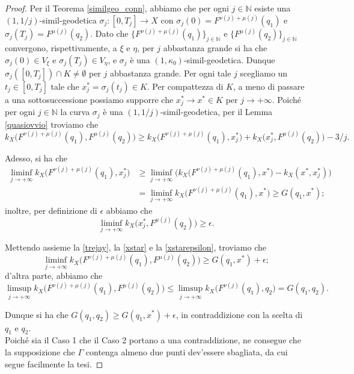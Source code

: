 \begin{proof}
    Per il Teorema \ref{similgeo_conn}, abbiamo che per ogni $j\in\mathbb{N}$ esiste una $(1,1/j)$-simil-geodetica $\sigma_j:[0,T_j]\longrightarrow X$ con $\sigma_j(0)=F^{\nu(j)+\mu(j)}(q_1)$ e $\sigma_j(T_j)=F^{\mu(j)}(q_2)$. Dato che $\{F^{\nu(j)+\mu(j)}(q_1)\}_{j\in\mathbb{N}}$ e $\{F^{\mu(j)}(q_2)\}_{j\in\mathbb{N}}$ convergono, rispettivamente, a $\xi$ e $\eta$, per $j$ abbastanza grande si ha che $\sigma_j(0)\in V_\xi$ e $\sigma_j(T_j)\in V_\eta$, e $\sigma_j$ è una $(1,\kappa_0)$-simil-geodetica. Dunque $\sigma_j([0,T_j])\cap K\not=\emptyset$ per $j$ abbastanza grande. Per ogni tale $j$ scegliamo un $t_j\in[0,T_j]$ tale che $x_j^*=\sigma_j(t_j)\in K$. Per compattezza di $K$, a meno di passare a una sottosuccessione possiamo supporre che $x_j^* \longrightarrow x^* \in K$ per $j\longrightarrow+\infty$. Poiché per ogni $j\in\mathbb{N}$ la curva $\sigma_j$ è una $(1,1/j)$-simil-geodetica, per il Lemma \ref{quasiovvio} troviamo che
    \begin{equation} \label{trejay}
        k_X\big(F^{\nu(j)+\mu(j)}(q_1),F^{\mu(j)}(q_2)\big) \ge k_X\big(F^{\nu(j)+\mu(j)}(q_1),x_j^*\big)+k_X\big(x_j^*,F^{\mu(j)}(q_2)\big)-3/j.
    \end{equation}

    Adesso, si ha che
    \begin{equation} \label{xstar}
        \begin{aligned}
            \liminf_{j\longrightarrow+\infty}k_X\big(F^{\nu(j)+\mu(j)}(q_1),x_j^*\big) &\ge \liminf_{j\longrightarrow+\infty} \Big(k_X\big(F^{\nu(j)+\mu(j)}(q_1),x^*\big)-k_X(x^*,x_j^*)\Big)\\
            &=\liminf_{j\longrightarrow+\infty}k_X\big(F^{\nu(j)+\mu(j)}(q_1),x^*\big) \ge G(q_1,x^*);
        \end{aligned}
    \end{equation}
    inoltre, per definizione di $\epsilon$ abbiamo che
    \begin{equation} \label{xstarepsilon}
        \liminf_{j\longrightarrow+\infty}k_X\big(x_j^*,F^{\mu(j)}(q_2)\big) \ge \epsilon.
    \end{equation}

    Mettendo assieme la \eqref{trejay}, la \eqref{xstar} e la \eqref{xstarepsilon}, troviamo che
    $$\liminf_{j\longrightarrow+\infty}k_X\big(F^{\nu(j)+\mu(j)}(q_1),F^{\mu(j)}(q_2)\big) \ge G(q_1,x^*)+\epsilon;$$
    d'altra parte, abbiamo che
    $$\limsup_{j\longrightarrow+\infty}k_X\big(F^{\nu(j)+\mu(j)}(q_1),F^{\mu(j)}(q_2)\big) \le \limsup_{j\longrightarrow+\infty}k_X\big(F^{\nu(j)}(q_1),q_2\big)=G(q_1,q_2).$$

    Dunque si ha che $G(q_1,q_2) \ge G(q_1,x^*)+\epsilon$, in contraddizione con la scelta di $q_1$ e $q_2$. \\

    Poiché sia il Caso 1 che il Caso 2 portano a una contraddizione, ne consegue che la supposizione che $\Gamma$ contenga almeno due punti dev'essere sbagliata, da cui segue facilmente la tesi.
\end{proof}

